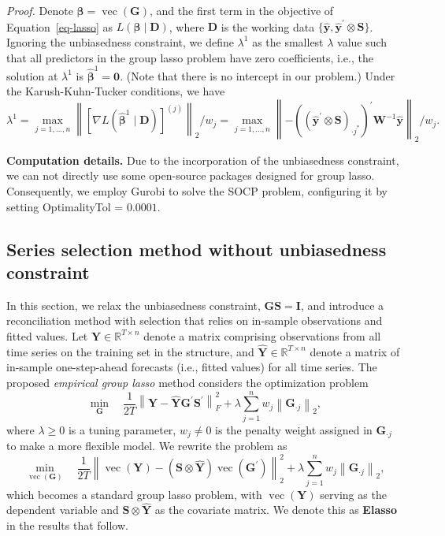 \documentclass[
  12pt,
  11pt]{article}
\begin{document}
\emph{Proof.} Denote \(\bm{\beta} = \operatorname{vec}(\bm{G})\), and
the first term in the objective of Equation~\ref{eq-lasso} as
\(L\left(\bm{\beta} \mid \bm{D}\right)\), where \(\bm{D}\) is the
working data
\(\{\hat{\bm{y}} , \hat{\bm{y}}^{\prime} \otimes \bm{S}\}\). Ignoring
the unbiasedness constraint, we define \(\lambda^{1}\) as the smallest
\(\lambda\) value such that all predictors in the group lasso problem
have zero coefficients, i.e., the solution at \(\lambda^{1}\) is
\(\hat{\bm{\beta}}^{1}=\bm{0}\). (Note that there is no intercept in our
problem.) Under the Karush-Kuhn-Tucker conditions, we have \[
\lambda^{1}
 = \max _{j=1, \ldots, n}\left\|\left[\nabla L\left(\hat{\bm{\beta}}^{1} \mid \bm{D}\right)\right]^{(j)}\right\|_2 / w_j
 = \max _{j=1, \ldots, n}\left\|-\left(\left(\hat{\bm{y}}^{\prime} \otimes \bm{S}\right)_{\cdot j^{*}}\right)^{\prime} \bm{W}^{-1} \hat{\bm{y}}\right\|_2 / w_j.
\]

\textbf{Computation details.} Due to the incorporation of the
unbiasedness constraint, we can not directly use some open-source
packages designed for group lasso. Consequently, we employ Gurobi to
solve the SOCP problem, configuring it by setting OptimalityTol =
\(0.0001\).

\hypertarget{sec-unconstrained}{%
\subsection{Series selection method without unbiasedness
constraint}\label{sec-unconstrained}}

In this section, we relax the unbiasedness constraint,
\(\bm{GS} = \bm{I}\), and introduce a reconciliation method with
selection that relies on in-sample observations and fitted values. Let
\(\bm{Y} \in \mathbb{R}^{T \times n}\) denote a matrix comprising
observations from all time series on the training set in the structure,
and \(\hat{\bm{Y}} \in \mathbb{R}^{T \times n}\) denote a matrix of
in-sample one-step-ahead forecasts (i.e., fitted values) for all time
series. The proposed \emph{empirical group lasso} method considers the
optimization problem \[
\min _{\bm{G}} \quad \frac{1}{2 T} \left\|\bm{Y}-\hat{\bm{Y}} \bm{G}^{\prime} \bm{S}^{\prime}\right\|_F^2 + \lambda \sum_{j=1}^n w_j \left\|\bm{G}_{\cdot j}\right\|_2,
\] where \(\lambda \geq 0\) is a tuning parameter, \(w_j \neq 0\) is the
penalty weight assigned in \(\bm{G}_{\cdot j}\) to make a more flexible
model. We rewrite the problem as \[
\min _{\operatorname{vec}(\bm{G})} \quad \frac{1}{2 T} \left\|\operatorname{vec}(\bm{Y})-(\bm{S} \otimes \hat{\bm{Y}}) \operatorname{vec}\left(\bm{G}^{\prime}\right)\right\|_2^2 + \lambda \sum_{j=1}^n w_j \left\|\bm{G}_{\cdot j}\right\|_2,
\] which becomes a standard group lasso problem, with
\(\operatorname{vec}(\bm{Y})\) serving as the dependent variable and
\(\bm{S} \otimes \hat{\bm{Y}}\) as the covariate matrix. We denote this
as \textbf{Elasso} in the results that follow.
\end{document}
